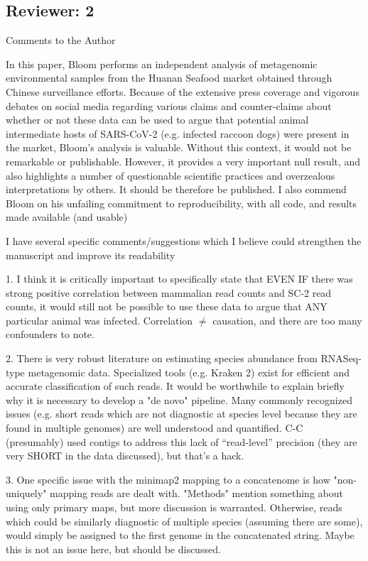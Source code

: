\documentclass[11pt, oneside]{article}   	%
\begin{document}
\subsection*{Reviewer: 2}

Comments to the Author

In this paper, Bloom performs an independent analysis of metagenomic environmental samples from the Huanan Seafood market obtained through Chinese surveillance efforts. Because of the extensive press coverage and vigorous debates on social media regarding various claims and counter-claims about whether or not these data can be used to argue that potential animal intermediate hosts of SARS-CoV-2 (e.g. infected raccoon dogs) were present in the market, Bloom's analysis is valuable. Without this context, it would not be remarkable or publishable. However, it provides a very important null result, and also highlights a number of questionable scientific practices and overzealous interpretations by others. It should be therefore be published. I also commend Bloom on his unfailing commitment to reproducibility, with all code, and results made available (and usable)

I have several specific comments/suggestions which I believe could strengthen the manuscript and improve its readability

1. I think it is critically important to specifically state that EVEN IF there was strong positive correlation between mammalian read counts and SC-2 read counts, it would still not be possible to use these data to argue that ANY particular animal was infected. Correlation $\ne$ causation, and there are too many confounders to note.

2. There is very robust literature on estimating species abundance from RNASeq-type metagenomic data. Specialized tools (e.g. Kraken 2) exist for efficient and accurate classification of such reads. It would be worthwhile to explain briefly why it is necessary to develop a "de novo" pipeline. Many commonly recognized issues (e.g. short reads which are not diagnostic at species level because they are found in multiple genomes) are well understood and quantified. C-C (presumably) used contigs to address this lack of ``read-level'' precision (they are very SHORT in the data discussed), but that's a hack.

3. One specific issue with the minimap2 mapping to a concatenome is how "non-uniquely" mapping reads are dealt with. "Methods" mention something about using only primary maps, but more discussion is warranted. Otherwise, reads which could be similarly diagnostic of multiple species (assuming there are some), would simply be assigned to the first genome in the concatenated string. Maybe this is not an issue here, but should be discussed.
\end{document}
